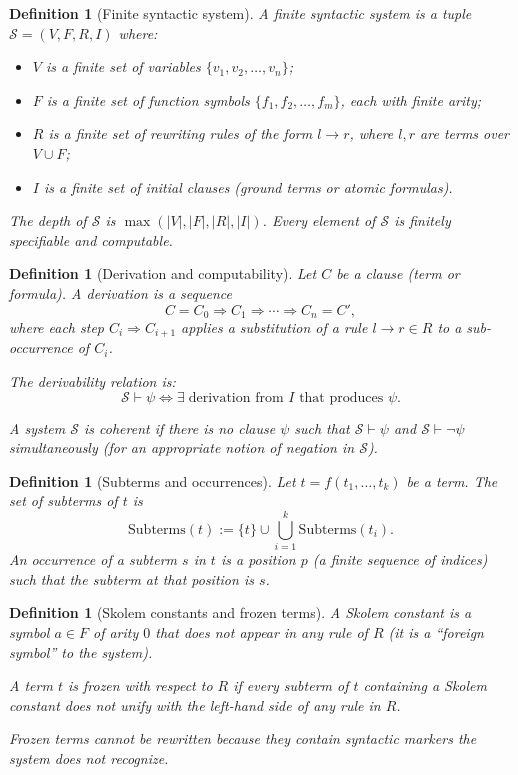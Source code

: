 \documentclass[11pt]{article}
\newtheorem{definition}[theorem]{Definition}
\begin{document}
\begin{definition}[Finite syntactic system]
\label{def:system}
A \emph{finite syntactic system} is a tuple
$\mathcal{S} = (V, F, R, I)$ where:
\begin{itemize}
  \item $V$ is a finite set of variables $\{v_1, v_2, \ldots, v_n\}$;
  \item $F$ is a finite set of function symbols
        $\{f_1, f_2, \ldots, f_m\}$, each with finite arity;
  \item $R$ is a finite set of rewriting rules of the form $l \to r$,
        where $l, r$ are terms over $V \cup F$;
  \item $I$ is a finite set of initial clauses (ground terms or atomic
        formulas).
\end{itemize}
The \emph{depth} of $\mathcal{S}$ is
$\max(|V|, |F|, |R|, |I|)$.
Every element of $\mathcal{S}$ is finitely specifiable and computable.
\end{definition}

\begin{definition}[Derivation and computability]
\label{def:derivation}
Let $C$ be a clause (term or formula). A \emph{derivation} is a sequence
\[
  C = C_0 \Rightarrow C_1 \Rightarrow \cdots \Rightarrow C_n = C',
\]
where each step $C_i \Rightarrow C_{i+1}$ applies a substitution of a
rule $l \to r \in R$ to a sub-occurrence of $C_i$.

The \emph{derivability relation} is:
\[
  \mathcal{S} \vdash \psi
  \iff
  \exists\;\text{derivation from } I \text{ that produces } \psi.
\]

A system $\mathcal{S}$ is \emph{coherent} if there is no clause $\psi$
such that $\mathcal{S} \vdash \psi$ and
$\mathcal{S} \vdash \neg \psi$ simultaneously (for an appropriate notion
of negation in $\mathcal{S}$).
\end{definition}

\begin{definition}[Subterms and occurrences]
\label{def:subterms}
Let $t = f(t_1, \ldots, t_k)$ be a term. The set of \emph{subterms} of
$t$ is
\[
  \mathrm{Subterms}(t) := \{t\} \cup \bigcup_{i=1}^{k}
    \mathrm{Subterms}(t_i).
\]
An \emph{occurrence} of a subterm $s$ in $t$ is a position $p$ (a finite
sequence of indices) such that the subterm at that position is $s$.
\end{definition}

\begin{definition}[Skolem constants and frozen terms]
\label{def:skolem-frozen}
A \emph{Skolem constant} is a symbol $a \in F$ of arity $0$ that does
not appear in any rule of $R$ (it is a ``foreign symbol'' to the
system).

A term $t$ is \emph{frozen} with respect to $R$ if every subterm of $t$
containing a Skolem constant does not unify with the left-hand side of
any rule in $R$.

Frozen terms cannot be rewritten because they contain syntactic markers
the system does not recognize.
\end{definition}
\end{document}
